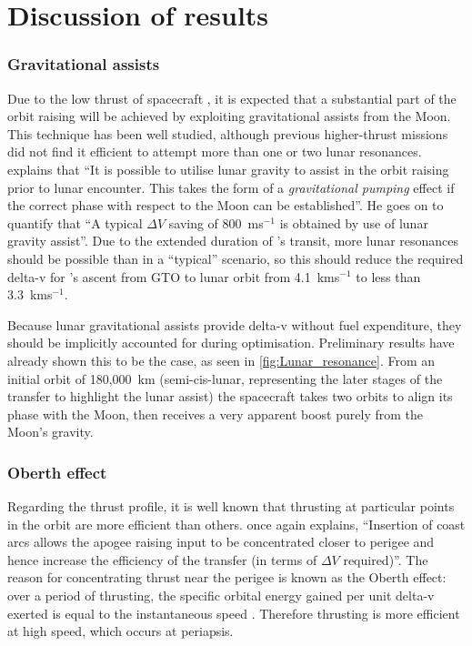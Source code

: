 \chapter{Discussion of results} \label{cha:Discussion-of-results}

\subsection{Gravitational assists}

Due to the low thrust of spacecraft \BW, it is expected that a substantial part of the orbit raising will be achieved by exploiting gravitational assists from the Moon. This technique has been well studied, although previous higher-thrust missions did not find it efficient to attempt more than one or two lunar resonances. \textcite{Kemble2006} explains that \enquote{It is possible to utilise lunar gravity to assist in the orbit raising prior to lunar encounter. This takes the form of a \emph{gravitational pumping} effect if the correct phase with respect to the Moon can be established}. He goes on to quantify that \enquote{A typical $\Delta V$ saving of 800~ms$^{-1}$ is obtained by use of lunar gravity assist}. Due to the extended duration of \BW's transit, more lunar resonances should be possible than in a \enquote{typical} scenario, so this should reduce the required delta-v for \BW's ascent from GTO to lunar orbit from 4.1~kms$^{-1}$ to less than 3.3~kms$^{-1}$.

Because lunar gravitational assists provide delta-v without fuel expenditure, they should be implicitly accounted for during optimisation. Preliminary results have already shown this to be the case, as seen in \autoref{fig:Lunar_resonance}. From an initial orbit of 180,000~km (semi-cis-lunar, representing the later stages of the transfer to highlight the lunar assist) the spacecraft takes two orbits to align its phase with the Moon, then receives a very apparent boost purely from the Moon's gravity.

\subsection{Oberth effect}

Regarding the thrust profile, it is well known that thrusting at particular points in the orbit are more efficient than others. \textcite{Kemble2006} once again explains, \enquote{Insertion of coast arcs allows the apogee raising input to be concentrated closer to perigee and hence increase the efficiency of the transfer (in terms of $\Delta V$ required)}. The reason for concentrating thrust near the perigee is known as the Oberth effect: over a period of thrusting, the specific orbital energy gained per unit delta-v exerted is equal to the instantaneous speed \parencite{Oberth1923}. Therefore thrusting is more efficient at high speed, which occurs at periapsis.
 

